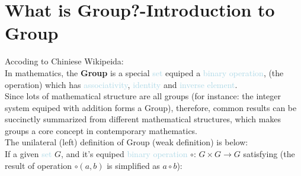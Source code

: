 \documentclass{Math_Note}
\begin{document}
\section{What is Group?-Introduction to Group}
\textcolor{softcyan}{Accoding to Chiniese Wikipeida:} \\
\marginpar{\textcolor{cyan}{core of Group}}
In mathematics, the \textbf{Group} is a special \textcolor{lightblue}{set} equiped a \textcolor{lightblue}{binary operation}, (the operation) 
which has \textcolor{lightblue}{associativity}, \textcolor{lightblue}{identity} and \textcolor{lightblue}{inverse element}. \\
\newline
Since lots of mathematical structure are all groups (for instance: the integer system equiped with addition forms a Group), therefore, 
common results can be succinctly summarized from different mathematical structures, which makes groups a core concept in contemporary mathematics. \\
\newline
\textcolor{softcyan}{The unilateral (left) definition of Group (weak definition) is below:} \\
\marginpar{\textcolor{cyan}{simplest definition of the Group}}
If a given \textcolor{lightblue}{set} $G$, and it's equiped \textcolor{lightblue}{binary operation} $\circ$: $G\times G\rightarrow G$ satisfying 
(the result of operation $\circ\left(a,b\right)$ is simplified as $a\circ b$): \\
\end{document}
